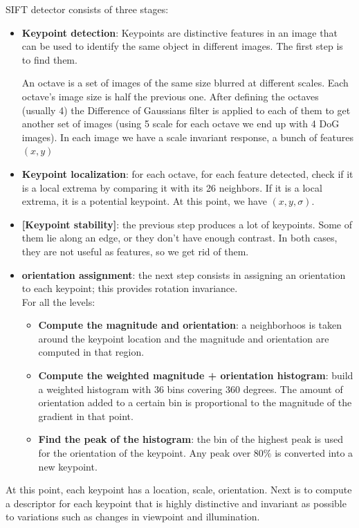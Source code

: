 \documentclass{article}
\begin{document}
SIFT detector consists of three stages:
\begin{itemize}
    \item \textbf{Keypoint detection}: Keypoints are distinctive features in an image that can be used to identify the same object in different images. The first step is to find them.

    An octave is a set of images of the same size blurred at different scales. Each octave's image size is half the previous one. After defining the octaves (usually 4) the Difference of Gaussians filter is applied to each of them to get another set of images (using 5 scale for each octave we end up with 4 DoG images). In each image we have a scale invariant response, a bunch of features $(x, y)$
    \item \textbf{Keypoint localization}: for each octave, for each feature detected, check if it is a local extrema by comparing it with its 26 neighbors. If it is a local extrema, it is a potential keypoint. At this point, we have $(x, y, \sigma)$.
    \item \textbf{[Keypoint stability]}: the previous step produces a lot of keypoints. Some of them lie along an edge, or they don't have enough contrast. In both cases, they are not useful as features, so we get rid of them.
    \item \textbf{orientation assignment}: the next step consists in assigning an orientation to each keypoint; this provides rotation invariance. \\
    For all the levels:
    \begin{itemize}
        \item \textbf{Compute the magnitude and orientation}: a neighborhoos is taken around the keypoint location and the magnitude and orientation are computed in that region.
        \item \textbf{Compute the weighted magnitude + orientation histogram}: build a weighted histogram with 36 bins covering 360 degrees. The amount of orientation added to a certain bin is proportional to the magnitude of the gradient in that point. 
        \item \textbf{Find the peak of the histogram}: the bin of the highest peak is used for the orientation of the keypoint. Any peak over $80\%$ is converted into a new keypoint.
    \end{itemize}
\end{itemize}

\newpage 

At this point, each keypoint has a location, scale, orientation. Next is to compute a descriptor for each keypoint that is highly distinctive and invariant as possible to variations such as changes in viewpoint and illumination. \\
\end{document}
